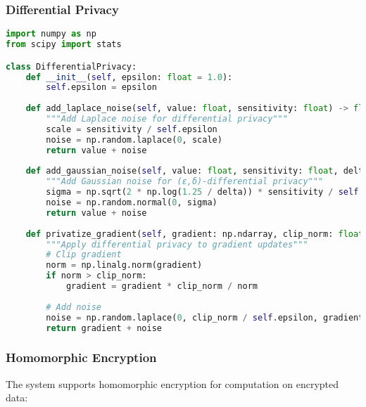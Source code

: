\subsubsection{Differential Privacy}
\begin{lstlisting}[language=python, caption=Differential Privacy Implementation]
import numpy as np
from scipy import stats

class DifferentialPrivacy:
    def __init__(self, epsilon: float = 1.0):
        self.epsilon = epsilon
        
    def add_laplace_noise(self, value: float, sensitivity: float) -> float:
        """Add Laplace noise for differential privacy"""
        scale = sensitivity / self.epsilon
        noise = np.random.laplace(0, scale)
        return value + noise
        
    def add_gaussian_noise(self, value: float, sensitivity: float, delta: float = 1e-5) -> float:
        """Add Gaussian noise for (ε,δ)-differential privacy"""
        sigma = np.sqrt(2 * np.log(1.25 / delta)) * sensitivity / self.epsilon
        noise = np.random.normal(0, sigma)
        return value + noise
        
    def privatize_gradient(self, gradient: np.ndarray, clip_norm: float = 1.0) -> np.ndarray:
        """Apply differential privacy to gradient updates"""
        # Clip gradient
        norm = np.linalg.norm(gradient)
        if norm > clip_norm:
            gradient = gradient * clip_norm / norm
            
        # Add noise
        noise = np.random.laplace(0, clip_norm / self.epsilon, gradient.shape)
        return gradient + noise
\end{lstlisting}

\subsubsection{Homomorphic Encryption}
The system supports homomorphic encryption for computation on encrypted data:

